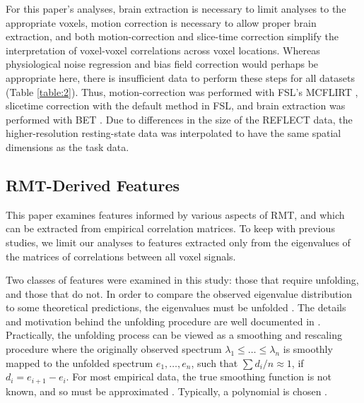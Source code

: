 \documentclass[10pt]{article}
\begin{document}
For this paper’s analyses, brain extraction is necessary to limit analyses to the appropriate
voxels, motion correction is necessary to allow proper brain extraction, and both motion-correction
and slice-time correction simplify the interpretation of voxel-voxel correlations across voxel
locations. Whereas physiological noise regression and bias field correction would perhaps be
appropriate here, there is insufficient data to perform these steps for all datasets (Table \ref{table:2}).
Thus, motion-correction was performed with FSL's MCFLIRT
\citep{jenkinsonImprovedOptimizationRobust2002}, slicetime correction with the default method in
FSL, and brain extraction was performed with BET \citep{smithFastRobustAutomated2002}. Due to
differences in the size of the REFLECT data, the higher-resolution resting-state data was
interpolated to have the same spatial dimensions as the task data.

\subsection{RMT-Derived Features}
This paper examines features informed by various aspects of RMT, and which can be extracted from
empirical correlation matrices. To keep with previous studies, we limit our analyses to features
extracted only from the eigenvalues of the matrices of correlations between all voxel signals.

Two classes of features were examined in this study: those that require unfolding, and those that do
not. In order to compare the observed eigenvalue distribution to some theoretical predictions, the
eigenvalues must be unfolded \citep{guhrRandommatrixTheoriesQuantum1998a,mehtaRandomMatrices2004}.
The details and motivation behind the unfolding procedure are well documented in
\cite{guhrRandommatrixTheoriesQuantum1998a}. Practically, the unfolding process can be viewed as a
smoothing and rescaling procedure where the originally observed spectrum \(\lambda_1 \le \dots \le
\lambda_n\) is smoothly mapped to the unfolded spectrum \(e_1, \dots, e_n\), such that \(\sum d_i/n
\approx 1\), if \(d_i = e_{i+1} - e_i \). For most empirical data, the true smoothing function is
not known, and so must be approximated
\citep{guhrRandommatrixTheoriesQuantum1998a,mehtaRandomMatrices2004}. Typically, a polynomial is
chosen \citep{abul-magdUnfoldingSpectrumChaotic2014}.
\end{document}
